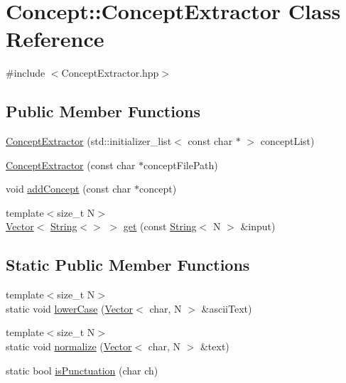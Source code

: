 \hypertarget{class_concept_1_1_concept_extractor}{}\section{Concept\+::Concept\+Extractor Class Reference}
\label{class_concept_1_1_concept_extractor}


{\ttfamily \#include $<$Concept\+Extractor.\+hpp$>$}

\subsection*{Public Member Functions}
\begin{DoxyCompactItemize}
\item 
\mbox{\hyperlink{class_concept_1_1_concept_extractor_a3368cfbb0efde84ec506ffa6dfa260b3}{Concept\+Extractor}} (std\+::initializer\+\_\+list$<$ const char $\ast$ $>$ concept\+List)
\item 
\mbox{\hyperlink{class_concept_1_1_concept_extractor_ad4f2e846cdbeed815dc018bc5235716c}{Concept\+Extractor}} (const char $\ast$concept\+File\+Path)
\item 
void \mbox{\hyperlink{class_concept_1_1_concept_extractor_af42c1de7919fccadf14e33f48af3fb3a}{add\+Concept}} (const char $\ast$concept)
\item 
{\footnotesize template$<$size\+\_\+t N$>$ }\\\mbox{\hyperlink{class_concept_1_1_vector}{Vector}}$<$ \mbox{\hyperlink{class_concept_1_1_string}{String}}$<$$>$ $>$ \mbox{\hyperlink{class_concept_1_1_concept_extractor_a34afbe33a9c98d648df5976202ac05cf}{get}} (const \mbox{\hyperlink{class_concept_1_1_string}{String}}$<$ N $>$ \&input)
\end{DoxyCompactItemize}
\subsection*{Static Public Member Functions}
\begin{DoxyCompactItemize}
\item 
{\footnotesize template$<$size\+\_\+t N$>$ }\\static void \mbox{\hyperlink{class_concept_1_1_concept_extractor_a975f600a76c667d317fbde638ebb0c48}{lower\+Case}} (\mbox{\hyperlink{class_concept_1_1_vector}{Vector}}$<$ char, N $>$ \&ascii\+Text)
\item 
{\footnotesize template$<$size\+\_\+t N$>$ }\\static void \mbox{\hyperlink{class_concept_1_1_concept_extractor_a48c47fd5c4eaa6b6bfd5edd127d5d492}{normalize}} (\mbox{\hyperlink{class_concept_1_1_vector}{Vector}}$<$ char, N $>$ \&text)
\item 
static bool \mbox{\hyperlink{class_concept_1_1_concept_extractor_ab4ca9179d4756d3d68b47c7256aea880}{is\+Punctuation}} (char ch)
\end{DoxyCompactItemize}
